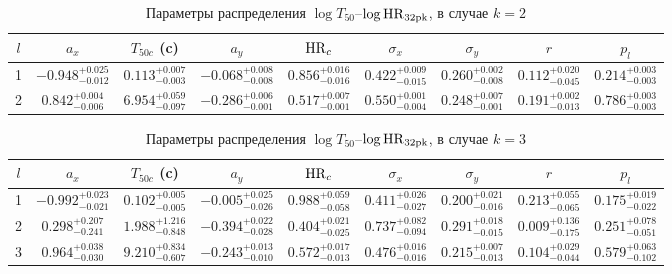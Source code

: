 \begin{table} [h]
 \centering
 \caption{Параметры распределения $\log T_{50}$--$\log {\mathrm{HR}}_{32{\mathrm{pk}}}$, в случае $k=2$}\label{tab:tab_2clusters_HRpk}
\scriptsize

  \begin{center}
  \begin{tabular}{c c c c c c c c c}
  \hline
  \hline
  $l$  &  $a_x$ &  $T_{50c}$ (c) &  $a_y$ &   ${\mathrm{HR}}_c$ &  $\sigma_x$ &  $\sigma_y$ &  $r$ &  $p_l$\\
  \hline
1 & $-0.948_{-  0.012}^{+  0.025}$ & $   0.113_{-  0.003}^{+  0.007}$ & $-0.068_{-  0.008}^{+  0.008}$ & $   0.856_{-  0.016}^{+  0.016}$ & $ 0.422_{-  0.015}^{+  0.009}$ & $ 0.260_{-  0.008}^{+  0.002}$ & $ 0.112_{-  0.045}^{+  0.020}$ & $ 0.214_{-  0.003}^{+  0.003}$\\
2 & $ 0.842_{-  0.006}^{+  0.004}$ & $   6.954_{-  0.097}^{+  0.059}$ & $-0.286_{-  0.001}^{+  0.006}$ & $   0.517_{-  0.001}^{+  0.007}$ & $ 0.550_{-  0.004}^{+  0.001}$ & $ 0.248_{-  0.001}^{+  0.007}$ & $ 0.191_{-  0.013}^{+  0.002}$ & $ 0.786_{-  0.003}^{+  0.003}$\\
\hline
\end{tabular}
\end{center}
\end{table}

\begin{table} [h]
 \centering
 \caption{Параметры распределения $\log T_{50}$--$\log {\mathrm{HR}}_{32{\mathrm{pk}}}$, в случае $k=3$}\label{tab:tab_3clusters_HRpk}
\scriptsize

  \begin{center}
  \begin{tabular}{c c c c c c c c c}
  \hline
  \hline
  $l$  &  $a_x$ &  $T_{50c}$ (c) &  $a_y$ &   ${\mathrm{HR}}_c$ &  $\sigma_x$ &  $\sigma_y$ &  $r$ &  $p_l$\\
  \hline
1 & $-0.992_{-  0.021}^{+  0.023}$ & $   0.102_{-  0.005}^{+  0.005}$ & $-0.005_{-  0.026}^{+  0.025}$ & $   0.988_{-  0.058}^{+  0.059}$ & $ 0.411_{-  0.027}^{+  0.026}$ & $ 0.200_{-  0.016}^{+  0.021}$ & $ 0.213_{-  0.065}^{+  0.055}$ & $ 0.175_{-  0.022}^{+  0.019}$\\
2 & $ 0.298_{-  0.241}^{+  0.207}$ & $   1.988_{-  0.848}^{+  1.216}$ & $-0.394_{-  0.028}^{+  0.022}$ & $   0.404_{-  0.025}^{+  0.021}$ & $ 0.737_{-  0.094}^{+  0.082}$ & $ 0.291_{-  0.015}^{+  0.018}$ & $ 0.009_{-  0.175}^{+  0.136}$ & $ 0.251_{-  0.051}^{+  0.078}$\\
3 & $ 0.964_{-  0.030}^{+  0.038}$ & $   9.210_{-  0.607}^{+  0.834}$ & $-0.243_{-  0.010}^{+  0.013}$ & $   0.572_{-  0.013}^{+  0.017}$ & $ 0.476_{-  0.016}^{+  0.016}$ & $ 0.215_{-  0.013}^{+  0.007}$ & $ 0.104_{-  0.044}^{+  0.029}$ & $ 0.579_{-  0.102}^{+  0.063}$\\
\hline
\end{tabular}
\end{center}
\end{table}
%